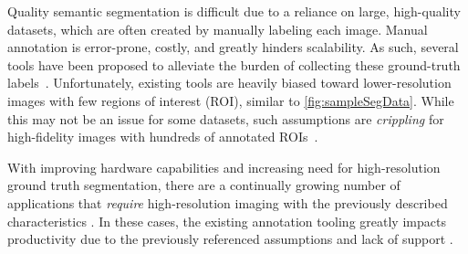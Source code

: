 Quality semantic segmentation is difficult due to a reliance on large, high-quality datasets, which are often created by manually labeling each image.
Manual annotation is error-prone, costly, and greatly hinders scalability. As such, several tools have been proposed to alleviate the burden of collecting these ground-truth labels~\cite{BestImageAnnotation}.
Unfortunately, existing tools are heavily biased toward lower-resolution images with few regions of interest (ROI), similar to \autoref{fig:sampleSegData}.
While this may not be an issue for some datasets, such assumptions are \emph{crippling} for high-fidelity images with hundreds of annotated ROIs~\cite{Ladicky_whatWhereCombiningCRFs,Wang_multiLabelImageAnnotation}.



With improving hardware capabilities and increasing need for high-resolution ground truth segmentation, there are a continually growing number of applications that \emph{require} high-resolution imaging with the previously described characteristics \cite{Mohajerani_cloudRemoteSensing,Demochkina_improvingOneShotXray}.
In these cases, the existing annotation tooling greatly impacts productivity due to the previously referenced assumptions and lack of support \cite{SpaceNet2020-lb}.

